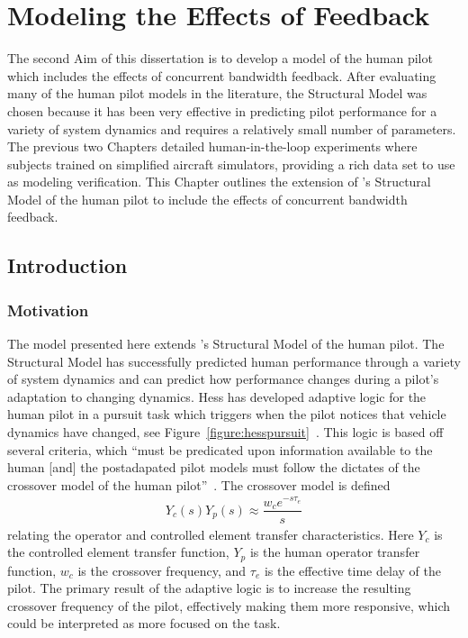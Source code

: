 \chapter{Modeling the Effects of Feedback}
\label{chapter:modeling}

The second Aim of this dissertation is to develop a model of the human pilot which includes the effects of concurrent bandwidth feedback.
After evaluating many of the human pilot models in the literature, the Structural Model was chosen because it has been very effective in predicting pilot performance for a variety of system dynamics and requires a relatively small number of parameters.
The previous two Chapters detailed human-in-the-loop experiments where subjects trained on simplified aircraft simulators, providing a rich data set to use as modeling verification.
This Chapter outlines the extension of \citeauthor{hess_unified_1997}'s Structural Model of the human pilot to include the effects of concurrent bandwidth feedback.

\section{Introduction}
\subsection{Motivation}
The model presented here extends \citeauthor{hess_unified_1997}'s \citeyear{hess_unified_1997} Structural Model of the human pilot.
The Structural Model has successfully predicted human performance through a variety of system dynamics and can predict how performance changes during a pilot's adaptation to changing dynamics.
Hess has developed adaptive logic for the human pilot in a pursuit task which triggers when the pilot notices that vehicle dynamics have changed, see Figure~\ref{figure:hesspursuit}~\citep{hess_modeling_2009}.
This logic is based off several criteria, which ``must be predicated upon information available to the human [and] the postadapated pilot models must follow the dictates of the crossover model of the human pilot''~\citep{hess_modeling_2009}.
The crossover model is defined
\begin{align}
    Y_c(s) Y_p(s) \approx \dfrac{w_c e^{-s \tau_e}}{s}
\end{align}
relating the operator and controlled element transfer characteristics.
Here $Y_c$ is the controlled element transfer function, $Y_p$ is the human operator transfer function, $w_c$ is the crossover frequency, and $\tau_e$ is the effective time delay of the pilot.
The primary result of the adaptive logic is to increase the resulting crossover frequency of the pilot, effectively making them more responsive, which could be interpreted as more focused on the task.

